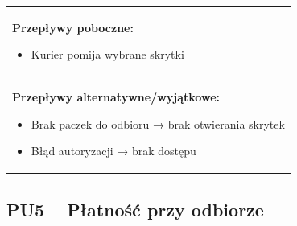 \documentclass[a4paper,12pt]{article}
\begin{document}
\begin{tabular}{|p{6cm}|p{4cm}|p{5cm}|}
{} \\
\hline
\multicolumn{3}{|p{15cm}|}{
\textbf{Przepływy poboczne:}
\begin{itemize}
\item Kurier pomija wybrane skrytki
\end{itemize}
} \\
\hline
\multicolumn{3}{|p{15cm}|}{
\textbf{Przepływy alternatywne/wyjątkowe:}
\begin{itemize}
\item Brak paczek do odbioru → brak otwierania skrytek
\item Błąd autoryzacji → brak dostępu
\end{itemize}
} \\
\hline
\end{tabular}

\vspace{1cm}

\subsection{PU5 – Płatność przy odbiorze}
\end{document}
